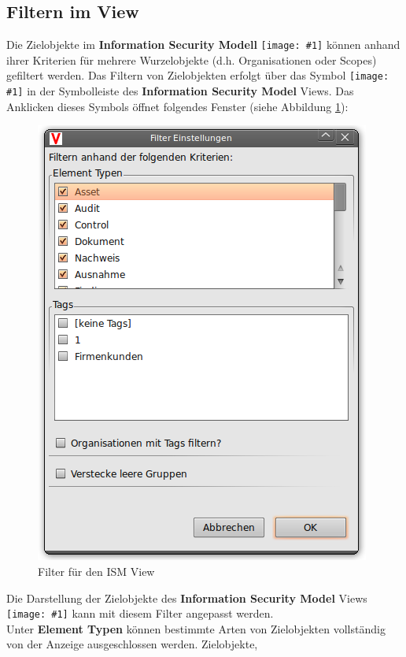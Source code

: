 \documentclass[a4paper,10pt]{book}
\newcommand{\icon}[1]{\texttt{[image: \#1]}}
\begin{document}
\subsection{Filtern im View}
Die Zielobjekte im \textbf{Information Security Modell} \icon{Icon/Informationssicherheitsmodell.png} können
anhand ihrer Kriterien für mehrere Wurzelobjekte (d.h. Organisationen oder Scopes) gefiltert werden.
Das Filtern von Zielobjekten erfolgt über das Symbol \icon{Icon/Filter.png} in der Symbolleiste des \textbf{Information Security Model} Views.
Das Anklicken dieses Symbols öffnet folgendes Fenster (siehe Abbildung \ref{Filter fuer den ISM View}):
\newline
\begin{figure}[htb!]
  \centering
  \includegraphics[scale=.7]{Screenshot/Ism-filter.png}
  \caption{\label{Filter fuer den ISM View} Filter für den ISM View}
\end{figure}
\newline
Die Darstellung der Zielobjekte des \textbf{Information Security Model} Views \icon{Icon/Informationssicherheitsmodell.png} kann
mit diesem Filter angepasst werden.
\newline\\
Unter \textbf{Element Typen} können bestimmte Arten von Zielobjekten vollständig von der Anzeige ausgeschlossen werden. Zielobjekte,
\end{document}

